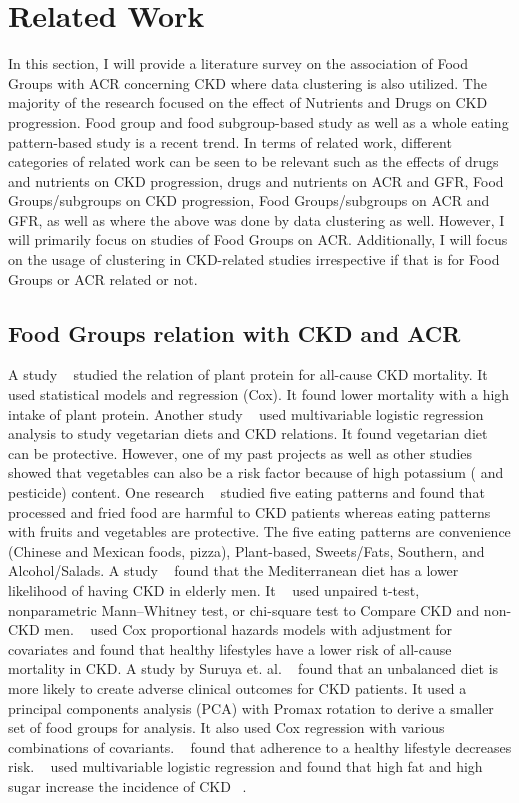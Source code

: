 \section{Related Work}

\flushleft \justifying In this section, I will provide a literature survey on the association of Food Groups with ACR concerning CKD where data clustering is also utilized. The majority of the research focused on the effect of Nutrients and Drugs on CKD progression. Food group and food subgroup-based study as well as a whole eating pattern-based study is a recent trend. In terms of related work, different categories of related work can be seen to be relevant such as the effects of drugs and nutrients on CKD progression, drugs and nutrients on ACR and GFR, Food Groups/subgroups on CKD progression, Food Groups/subgroups on ACR and GFR, as well as where the above was done by data clustering as well. However, I will primarily focus on studies of Food Groups on ACR. Additionally, I will focus on the usage of clustering in CKD-related studies irrespective if that is for Food Groups or ACR related or not.

\subsection{Food Groups relation with CKD and ACR}
\flushleft \justifying A study ~\cite{Chen2016} studied the relation of plant protein for all-cause CKD mortality. It used statistical models and regression (Cox). It found lower mortality with a high intake of plant protein. Another study ~\cite{Liu2019} used multivariable logistic regression analysis to study vegetarian diets and CKD relations. It found vegetarian diet can be protective. However, one of my past projects as well as other studies ~\cite{Aleix2019} showed that vegetables can also be a risk factor because of high potassium ( and pesticide) content. One research ~\cite{Gutierrez2014} studied five eating patterns and found that processed and fried food are harmful to CKD patients whereas eating patterns with fruits and vegetables are protective. The five eating patterns are convenience (Chinese and Mexican foods, pizza), Plant-based, Sweets/Fats, Southern, and Alcohol/Salads. A study ~\cite{Huang2013} found that the Mediterranean diet has a lower likelihood of having CKD in elderly men. It ~\cite{Huang2013} used unpaired t-test, nonparametric Mann–Whitney test, or chi-square test to Compare CKD and non-CKD men. ~\cite{Ricardo2013} used Cox proportional hazards models with adjustment for covariates and found that healthy lifestyles have a lower risk of all-cause mortality in CKD. A study by Suruya et. al. ~\cite{Tsuruya2015} found that an unbalanced diet is more likely to create adverse clinical outcomes for CKD patients. It used a principal components analysis (PCA) with Promax rotation to derive a smaller set of food groups for analysis. It also used Cox regression with various combinations of covariants. ~\cite{Ricardo2015} found that adherence to a healthy lifestyle decreases risk. ~\cite{Asghari} used multivariable logistic regression and found that high fat and high sugar increase the incidence of CKD ~\cite{ahmed2018}.

